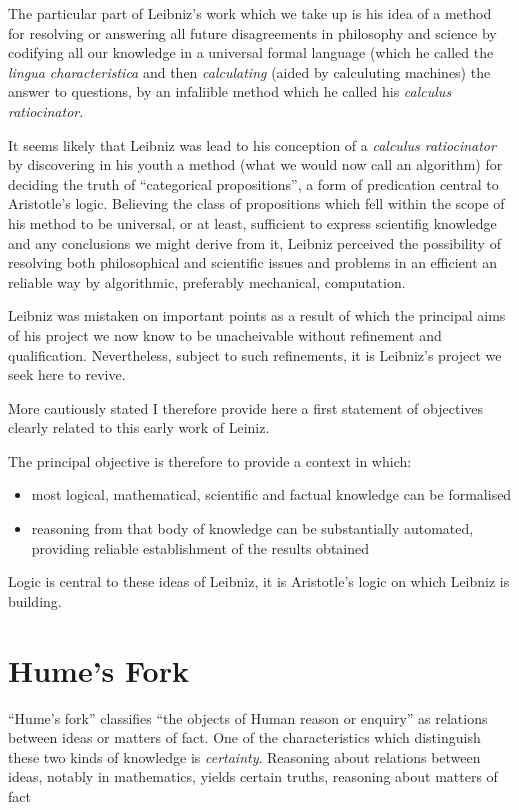 The particular part of Leibniz's work which we take up is his idea of a method for resolving or answering all future disagreements in philosophy and science by codifying all our knowledge in a universal formal language (which he called the {\it lingua characteristica} and then {\it calculating} (aided by calculuting machines) the answer to questions, by an infaliible method which he called his {\it calculus ratiocinator}.

It seems likely that Leibniz was lead to his conception of a {\it calculus ratiocinator} by discovering in his youth a method (what we would now call an algorithm) for deciding the truth of ``categorical propositions'', a form of predication central to Aristotle's logic.
Believing the class of propositions which fell within the scope of his method to be universal, or at least, sufficient to express scientifig knowledge and any conclusions we might derive from it, Leibniz perceived the possibility of resolving both philosophical and scientific issues and problems in an efficient an reliable way by algorithmic, preferably mechanical, computation.

Leibniz was mistaken on important points as a result of which the principal aims of his project we now know to be unacheivable without refinement and qualification.
Nevertheless, subject to such refinements, it is Leibniz's project we seek here to revive.

More cautiously stated I therefore provide here a first statement of objectives clearly related to this early work of Leiniz.

The principal objective is therefore to provide a context in which:

\begin{itemize}
\item most logical, mathematical, scientific and factual knowledge can be formalised
\item reasoning from that body of knowledge can be substantially automated, providing reliable establishment of the results obtained
\end{itemize}

Logic is central to these ideas of Leibniz, it is Aristotle's logic on which Leibniz is building.
 
\section{Hume's Fork}

``Hume's fork'' classifies ``the objects of Human reason or enquiry'' as relations between ideas or matters of fact.
One of the characteristics which distinguish these two kinds of knowledge is {\it certainty}.
Reasoning about relations between ideas, notably in mathematics, yields certain truths, reasoning about matters of fact 

